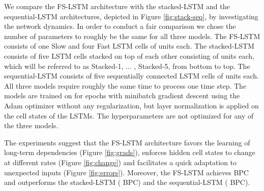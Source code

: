 \documentclass{article}
\begin{document}
 We compare the FS-LSTM architecture with the stacked-LSTM  and the sequential-LSTM architectures,  depicted in Figure \ref{fig:stack-seq}, by investigating the network dynamics.  In order to conduct a fair comparison we chose the number of parameters to roughly be the same for all three models. The  FS-LSTM consists of  one Slow and four Fast LSTM cells of  units each. The stacked-LSTM consists of five LSTM cells stacked on top of each other consisting of  units each, which will be referred to as Stacked-1, ... , Stacked-5, from bottom to top. The sequential-LSTM consists of five sequentially connected LSTM cells of  units each. All three models require roughly the same time to process one time step. The models are trained on  for  epochs with minibatch gradient descent using the Adam optimizer \cite{kingma14adam} without any regularization, but layer normalization \cite{ba16layernorm} is applied on the cell states of the LSTMs. The hyperparameters are not optimized for any of the three models. 
 
 The experiments suggest that the FS-LSTM architecture favors the learning of long-term dependencies (Figure \ref{fig:grads}), enforces hidden cell states to change at different rates (Figure \ref{fig:change}) and facilitates a quick adaptation to unexpected inputs (Figure \ref{fig:errors}). Moreover,  the FS-LSTM achieves   BPC and outperforms the stacked-LSTM ( BPC) and the sequential-LSTM ( BPC).
 

 
\end{document}
